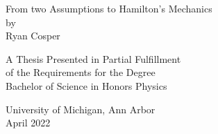 \documentclass[11pt]{book}
\newcommand{\doublespace} {
  \renewcommand{\baselinestretch}{1.66}\small\normalsize
}
\newcommand{\exactdoublespace} {
  \renewcommand{\baselinestretch}{1.8}\small\normalsize
}
\newcommand{\singlespace} {
  \renewcommand{\baselinestretch}{0.9}\small\normalsize
}
\newlength{\fiveblanklines}\setlength{\fiveblanklines}{0.7 in}
\newlength{\tenblanklines}\setlength{\tenblanklines}{1.5 in}
\begin{document}
\thispagestyle{empty}
\exactdoublespace
  \begin{center}
    From two Assumptions to Hamilton's Mechanics\\
    by\\
    Ryan Cosper
  \end{center}
  \singlespace

  \vspace{\fiveblanklines}
  \begin{center}
    \singlespace
A Thesis Presented in Partial Fulfillment\\
of the Requirements for the Degree\\
Bachelor of Science in Honors Physics
  \end{center}
  \vspace{\tenblanklines}
   \vfill
   \begin{center}
   \doublespace
   University of Michigan, Ann Arbor\\
   April 2022
   \end{center}
\newpage
\end{document}
